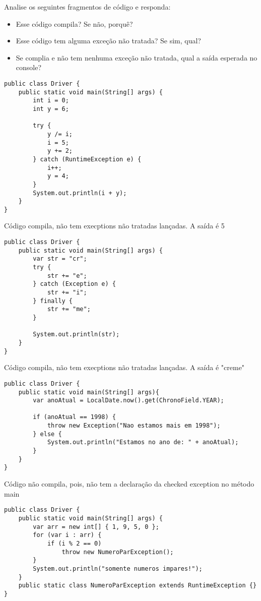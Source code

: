\documentclass{lib/eng_softdoc}
\begin{document}
\makeheader

\problem Analise os seguintes fragmentos de código e responda: 
\begin{itemize}
        \item Esse código compila? Se não, porquê?
        \item Esse código tem alguma exceção não tratada? Se sim, qual?
        \item Se complia e não tem nenhuma exceção não tratada, qual a saída esperada no console?
\end{itemize}

\subproblem
\begin{lstlisting}
public class Driver {
	public static void main(String[] args) {
		int i = 0;
		int y = 6;

		try {
			y /= i;
			i = 5;
			y += 2;
		} catch (RuntimeException e) {
			i++;
			y = 4;
		}
		System.out.println(i + y);
	}
}
\end{lstlisting}

\answer
Código compila, não tem execptions não tratadas lançadas. A saída é 5


\vspace{0.25cm}
\subproblem
\begin{lstlisting}
public class Driver {
	public static void main(String[] args) {
		var str = "cr";
		try {
			str += "e";
		} catch (Exception e) {
			str += "i";
		} finally {
			str += "me";
		}

		System.out.println(str);
	}
}
\end{lstlisting}

\answer
Código compila, não tem execptions não tratadas lançadas. A saída é "creme"

\vspace{0.5cm}

\subproblem
\begin{lstlisting}
public class Driver {
	public static void main(String[] args){
		var anoAtual = LocalDate.now().get(ChronoField.YEAR);

		if (anoAtual == 1998) {
			throw new Exception("Nao estamos mais em 1998");
		} else {
			System.out.println("Estamos no ano de: " + anoAtual);
		}
	}
}
\end{lstlisting}
\answer Código não compila, pois, não tem a declaração da checked exception no método main  
\vspace{0.5cm}

\subproblem
\begin{lstlisting}
public class Driver {
	public static void main(String[] args) {
		var arr = new int[] { 1, 9, 5, 0 };
		for (var i : arr) {
			if (i % 2 == 0)
				throw new NumeroParException();
		}
		System.out.println("somente numeros impares!");
	}
	public static class NumeroParException extends RuntimeException {}
}
\end{lstlisting}
\end{document}
